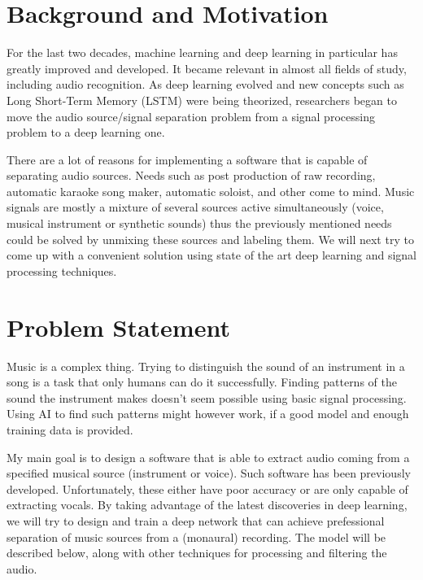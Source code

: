 \documentclass[../Thesis.tex]{subfiles}
\begin{document}
 
\section  {Background and Motivation}
For the last two decades, machine learning and deep learning in particular has greatly improved and developed. It became relevant in almost all fields of study, including audio recognition. As deep learning evolved and new concepts such as Long Short-Term Memory (LSTM) were being theorized, researchers began to move the audio source/signal separation problem from a signal processing problem to a deep learning one. 

There are a lot of reasons for implementing a software that is capable of separating audio sources. Needs such as post production of raw recording, automatic karaoke song maker, automatic soloist, and other come to mind. Music signals are mostly a mixture of several sources active simultaneously (voice, musical instrument or synthetic sounds) thus the previously mentioned needs could be solved by unmixing these sources and labeling them. We will next try to come up with a convenient solution using state of the art deep learning and signal processing techniques.

\section {Problem Statement}
Music is a complex thing. Trying to distinguish the sound of an instrument in a song is a task that only humans can do it successfully. Finding patterns of the sound the instrument makes doesn’t seem possible using basic signal processing. Using AI to find such patterns might however work, if a good model and enough training data is provided.

My main goal is to design a software that is able to extract audio coming from a specified musical source (instrument or voice). Such software has been previously developed. Unfortunately, these either have poor accuracy or are only capable of extracting vocals. By taking advantage of the latest discoveries in deep learning, we will try to design and train a deep network that can achieve prefessional separation of music sources from a (monaural) recording. The model will be described below, along with other techniques for processing and filtering the audio.
 
\end{document}
